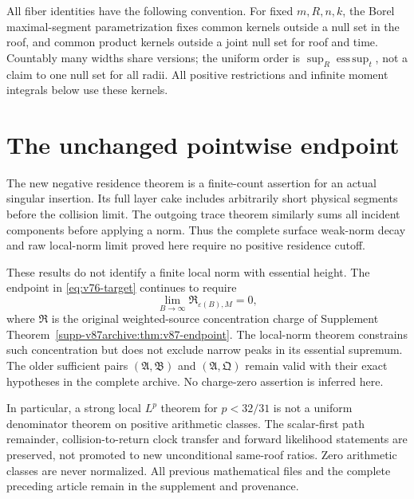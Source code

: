 \documentclass[11pt,reqno]{amsart}
\numberwithin{equation}{section}
\theoremstyle{definition}
\theoremstyle{remark}\newtheorem{remark}[theorem]{Remark}
\begin{document}
All fiber identities have the following convention. For fixed
$m,R,n,k$, the Borel maximal-segment parametrization fixes common
kernels outside a null set in the roof, and common product kernels
outside a joint null set for roof and time. Countably many widths
share versions; the uniform order is $\sup_R\operatorname*{ess\,sup}_t$,
not a claim to one null set for all radii. All positive restrictions
and infinite moment integrals below use these kernels.





\section{The unchanged pointwise endpoint}
The new negative residence theorem is a finite-count assertion for an
actual singular insertion. Its full layer cake includes arbitrarily
short physical segments before the collision limit. The outgoing
trace theorem similarly sums all incident components before applying
a norm. Thus the complete surface weak-norm decay and raw local-norm
limit proved here require no positive residence cutoff.

These results do not identify a finite local norm with essential
height. The endpoint in \eqref{eq:v76-target} continues to require
\[
 \lim_{B\to\infty}\mathfrak R_{\varepsilon(B),M}=0,
\]
where $\mathfrak R$ is the original weighted-source concentration
charge of Supplement Theorem~\ref{supp-v87archive:thm:v87-endpoint}.
The local-norm theorem constrains such concentration but does not
exclude narrow peaks in its essential supremum. The older sufficient
pairs $(\mathfrak A,\mathfrak B)$ and $(\mathfrak A,\mathfrak Q)$
remain valid with their exact hypotheses in the complete archive.
No charge-zero assertion is inferred here.

In particular, a strong local $L^p$ theorem for $p<32/31$ is not a
uniform denominator theorem on positive arithmetic classes. The
scalar-first path remainder, collision-to-return clock transfer and
forward likelihood statements are preserved, not promoted to new
unconditional same-roof ratios. Zero arithmetic classes are never
normalized. All previous mathematical files and the complete preceding
article remain in the supplement and provenance.


\end{document}
